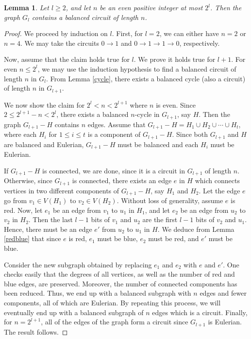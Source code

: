 \documentclass[10pt,a4paper]{amsart}
\newtheorem{lemma}{Lemma}
\begin{document}
\begin{lemma}\label{nin}
Let $l \geqslant 2$, and let $n$ be an even positive integer at most $2^l$. Then the graph $G_l$ contains a balanced circuit of length $n$.
\end{lemma}

\begin{proof}
We proceed by induction on $l$. First, for $l=2$, we can either have $n=2$ or $n=4$. We may take the circuits $0 \to 1$ and $0 \to 1 \to 1 \to 0$, respectively. 

Now, assume that the claim holds true for $l$. We prove it holds true for $l+1$. For even $n \leqslant 2^l$, we may use the induction hypothesis to find a balanced circuit of length $n$ in $G_l$. From Lemma \ref{cycle}, there exists a balanced cycle (also a circuit) of length $n$ in $G_{l+1}$. 

We now show the claim for $2^l < n < 2^{l+1}$ where $n$ is even. Since $2 \leqslant 2^{l+1}-n < 2^l$, there exists a balanced $n$-cycle in $G_{l+1}$, say $H$. Then the graph $G_{l+1}-H$ contains $n$ edges. Assume that $G_{l+1}-H = H_1 \cup H_2 \cup \cdots \cup H_t$, where each $H_i$ for $1 \leqslant i \leqslant t$ is a component of $G_{l+1}-H$. Since both $G_{l+1}$ and $H$ are balanced and Eulerian, $G_{l+1}-H$ must be balanced and each $H_i$ must be Eulerian.

If $G_{l+1}-H$ is connected, we are done, since it is a circuit in $G_{l+1}$ of length $n$. Otherwise, since $G_{l+1}$ is connected, there exists an edge $e$ in $H$ which connects vertices in two different components of $G_{l+1}-H$, say $H_1$ and $H_2$. Let the edge $e$ go from $v_1 \in V(H_1)$ to $v_2 \in V(H_2)$. Without loss of generality, assume $e$ is red. Now, let $e_1$ be an edge from $v_1$ to $u_1$ in $H_1$, and let $e_2$ be an edge from $u_2$ to $v_2$ in $H_2$. Then the last $l-1$ bits of $v_1$ and $u_2$ are the first $l-1$ bits of $v_2$ and $u_1$. Hence, there must be an edge $e'$ from $u_2$ to $u_1$ in $H$. We deduce from Lemma \ref{redblue} that since $e$ is red, $e_1$ must be blue, $e_2$ must be red, and $e'$ must be blue.

Consider the new subgraph obtained by replacing $e_1$ and $e_2$ with $e$ and $e'$. One checks easily that the degrees of all vertices, as well as the number of red and blue edges, are preserved. Moreover, the number of connected components has been reduced. Thus, we end up with a balanced subgraph with $n$ edges and fewer components, all of which are Eulerian. By repeating this process, we will eventually end up with a balanced subgraph of $n$ edges which is a circuit. Finally, for $n=2^{l+1}$, all of the edges of the graph form a circuit since $G_{l+1}$ is Eulerian. The result follows.
\end{proof}
\end{document}
